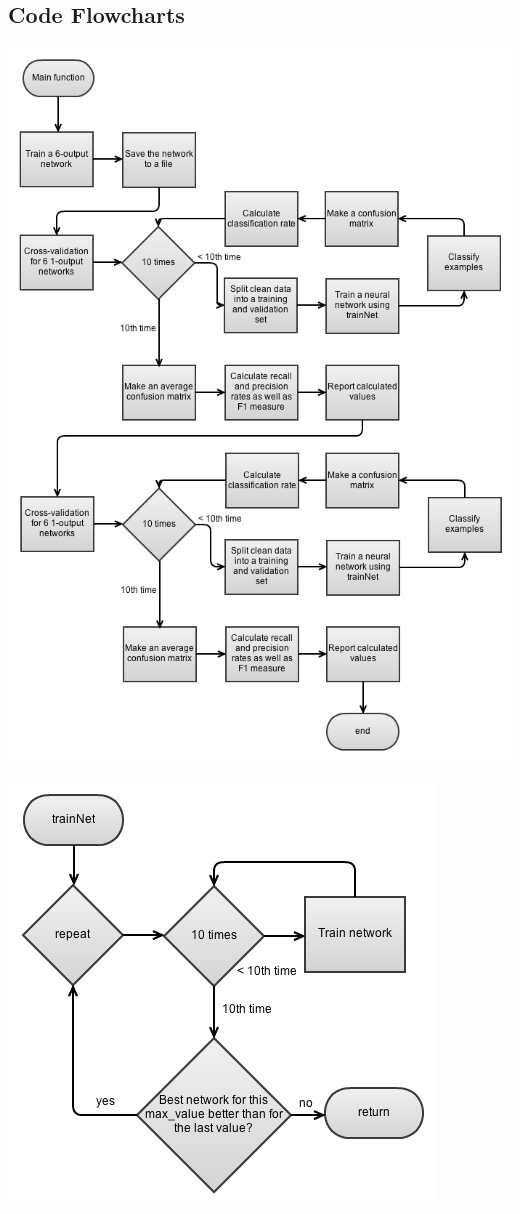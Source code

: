 \documentclass[12pt]{article}
\begin{document}
\newpage
\subsection*{Code Flowcharts}

\begin{center}
  \includegraphics[scale=0.7]{report-images/main.png}
\end{center}

\begin{center}
  \includegraphics[scale=0.7]{report-images/trainnet.png}
\end{center}
\end{document}
